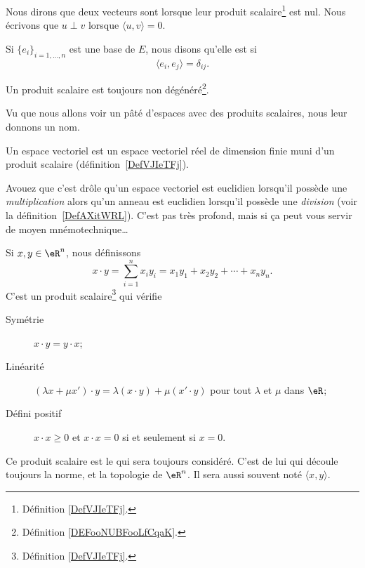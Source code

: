 \begin{definition}      \label{DEFooZBWTooIqXwRp}
	Nous dirons que deux vecteurs sont  lorsque leur produit scalaire\footnote{Définition \ref{DefVJIeTFj}.} est nul. Nous écrivons que \( u\perp v\) lorsque \( \langle u, v\rangle =0\).

	Si \( \{ e_i \}_{i=1,\ldots, n}\) est une base de \( E\), nous disons qu'elle est  si
	\begin{equation}
		\langle e_i, e_j\rangle =\delta_{ij}.
	\end{equation}
\end{definition}

\begin{lemma}       \label{LEMooLPUFooVCvnwW}
	Un produit scalaire est toujours non dégénéré\footnote{Définition \ref{DEFooNUBFooLfCqaK}.}.
\end{lemma}


Vu que nous allons voir un pâté d'espaces avec des produits scalaires, nous leur donnons un nom.
\begin{definition}\label{DefLZMcvfj}
	Un espace vectoriel  est un espace vectoriel réel de dimension finie muni d'un produit scalaire (définition~\ref{DefVJIeTFj}).
\end{definition}
Avouez que c'est drôle qu'un espace vectoriel est euclidien lorsqu'il possède une \emph{multiplication} alors qu'un anneau est euclidien lorsqu'il possède une \emph{division} (voir la définition~\ref{DefAXitWRL}). C'est pas très profond, mais si ça peut vous servir de moyen mnémotechnique\ldots

\begin{propositionDef}     \label{PROPooSKVRooDGVCYj}
	Si \( x,y\in \eR^n\), nous définissons
	\begin{equation}        \label{EQooFITHooEXDCGd}
		x\cdot y=\sum_{i=1}^n x_iy_i =x_1y_1+x_2y_2+\cdots+x_ny_n.
	\end{equation}
	C'est un produit scalaire\footnote{Définition \ref{DefVJIeTFj}.} qui vérifie
	\begin{description}
		\item[Symétrie] \( x\cdot y=y\cdot x\);
		\item[Linéarité] \( (\lambda x+\mu x')\cdot y=\lambda(x\cdot y)+\mu(x'\cdot y)\) pour tout \( \lambda\) et \( \mu\) dans \( \eR\);
		\item[Défini positif] \( x\cdot x\geq 0\)  et \(x\cdot x=0\) si et seulement si \( x=0\).
	\end{description}
	Ce produit scalaire est le  qui sera toujours considéré. C'est de lui qui découle toujours la norme, et la topologie de \( \eR^n\). Il sera aussi souvent noté \( \langle x, y\rangle \).
\end{propositionDef}


